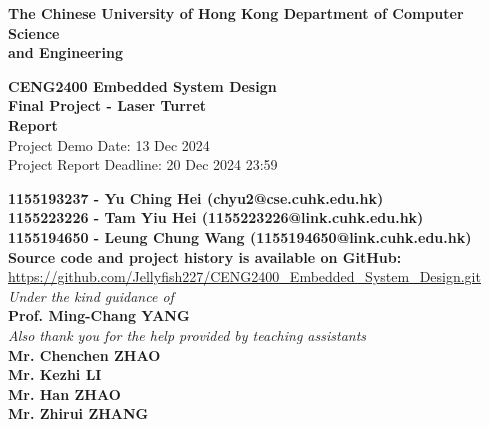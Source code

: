 \documentclass[12pt, a4paper]{article}
\begin{document}
\begin{titlepage}
    \begin{center}

		\bf\LARGE{The Chinese University of Hong Kong}
        \bf\Large{Department of Computer Science\\and Engineering}
		
		\vspace{80pt}
		
		\vspace{15pt}
		\textbf{\Large CENG2400 Embedded System Design\\}
		\vspace{6pt}
		\textbf{\Large Final Project - Laser Turret}\\
		\vspace{6pt}
		\textbf{\Large Report}\\
        \vspace{6pt}
        {\large Project Demo Date: 13 Dec 2024}\\
        {\large Project Report Deadline: 20 Dec 2024 23:59}
		\vspace{40pt}
		
        \vspace{15pt}
		\textbf{\normalsize
            1155193237 - Yu Ching Hei (chyu2@cse.cuhk.edu.hk)\\
			1155223226 - Tam Yiu Hei (1155223226@link.cuhk.edu.hk)\\
			1155194650 - Leung Chung Wang (1155194650@link.cuhk.edu.hk)\\}
		\vspace{40pt}
        \textbf{\large Source code and project history is available on GitHub:}\\
        \normalsize \url{https://github.com/Jellyfish227/CENG2400_Embedded_System_Design.git}\\
        \vspace{60pt}
		\textit{Under the kind guidance of}\\
		\textbf{\large Prof. Ming-Chang YANG}\\
		\vspace{20pt}
        \textit{Also thank you for the help provided by teaching assistants}\\
		\textbf{\large 
        Mr. Chenchen ZHAO\\
        Mr. Kezhi LI\\
        Mr. Han ZHAO\\
        Mr. Zhirui ZHANG\\
        }
		
	\end{center}
\end{titlepage}
\setcounter{page}{2}
\tableofcontents
\end{document}
